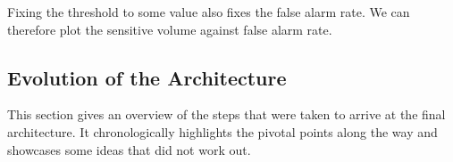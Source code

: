 Fixing the threshold to some value also fixes the false alarm rate. We can therefore plot the sensitive volume against false alarm rate.

\subsection{Evolution of the Architecture}\label{sec:evolution_of_architecture}
This section gives an overview of the steps that were taken to arrive at the final architecture. It chronologically highlights the pivotal points along the way and showcases some ideas that did not work out.

